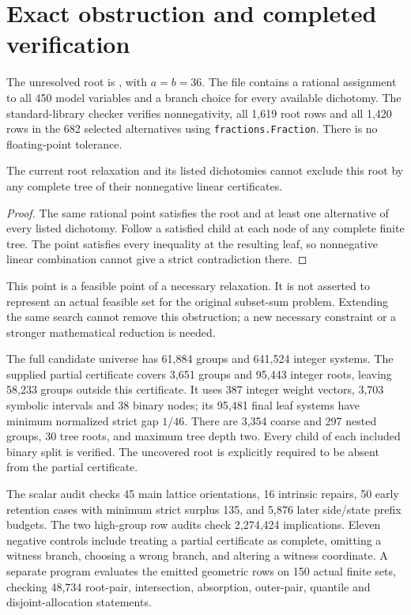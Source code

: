 \documentclass[11pt,a4paper]{article}
\begin{document}
\section{Exact obstruction and completed verification}
The unresolved root is
, with $a=b=36$.
The file  contains a rational
assignment to all 450 model variables and a branch choice for every available
dichotomy. The standard-library checker verifies nonnegativity, all 1,619
root rows and all 1,420 rows in the 682 selected alternatives using
\texttt{fractions.Fraction}. There is no floating-point tolerance.

\begin{proposition}
The current root relaxation and its listed dichotomies cannot exclude this
root by any complete tree of their nonnegative linear certificates.
\end{proposition}
\begin{proof}
The same rational point satisfies the root and at least one alternative of
every listed dichotomy. Follow a satisfied child at each node of any complete
finite tree. The point satisfies every inequality at the resulting leaf,
so nonnegative linear combination cannot give a strict contradiction there.
\end{proof}
This point is a feasible point of a necessary relaxation. It is not asserted
to represent an actual feasible set for the original subset-sum problem.
Extending the same search cannot remove this obstruction; a new necessary
constraint or a stronger mathematical reduction is needed.

The full candidate universe has 61,884 groups and 641,524 integer systems.
The supplied partial certificate covers 3,651 groups and 95,443 integer roots,
leaving 58,233 groups outside this certificate. It uses 387 integer weight
vectors, 3,703 symbolic intervals and 38 binary nodes; its 95,481 final leaf
systems have minimum normalized strict gap $1/46$. There are 3,354 coarse
and 297 nested groups, 30 tree roots, and maximum tree depth two.
Every child of each included binary split is verified. The uncovered root
is explicitly required to be absent from the partial certificate.

The scalar audit checks 45 main lattice orientations, 16 intrinsic repairs,
50 early retention cases with minimum strict surplus 135, and 5,876 later
side/state prefix budgets. The two high-group row audits check 2,274,424
implications. Eleven negative controls include treating a partial certificate
as complete, omitting a witness branch, choosing a wrong branch, and altering
a witness coordinate. A separate program evaluates the emitted geometric
rows on 150 actual finite sets, checking 48,734 root-pair, intersection,
absorption, outer-pair, quantile and disjoint-allocation statements.
\end{document}
